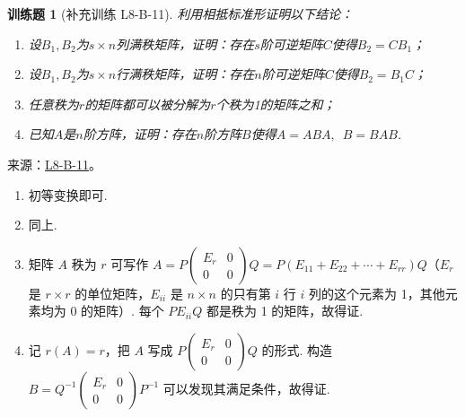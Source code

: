 \documentclass[UTF8,12pt,a4paper,fontset=fandol]{ctexart}
\newtheorem{exercise}{训练题}[section]
\begin{document}
\begin{exercise}[补充训练 L8-B-11]\label{prob:L8-B-11}
利用相抵标准形证明以下结论：
        \begin{enumerate}
            \item 设$B_1,B_2$为$s \times n$列满秩矩阵，证明：存在$s$阶可逆矩阵$C$使得$B_2=CB_1$；

            \item 设$B_1,B_2$为$s \times n$行满秩矩阵，证明：存在$n$阶可逆矩阵$C$使得$B_2=B_1C$；

            \item 任意秩为$r$的矩阵都可以被分解为$r$个秩为1的矩阵之和；

            \item 已知$A$是$n$阶方阵，证明：存在$n$阶方阵$B$使得$A=ABA,\enspace B=BAB$.
        \end{enumerate}
\end{exercise}
\noindent 来源：\href{https://github.com/yhwu-is/Linear-Algebra-Left-Undone/blob/new/%E8%AE%B2%E4%B9%89/%E4%B8%93%E9%A2%98/8%20%E7%9B%B8%E6%8A%B5%E6%A0%87%E5%87%86%E5%BD%A2.tex}{L8-B-11}。
\begin{solve}
\begin{enumerate}
                \item 初等变换即可.

                \item 同上.

                \item 矩阵 $A$ 秩为 $r$ 可写作 $A=P\begin{pmatrix}E_r & 0 \\ 0 & 0\end{pmatrix}Q = P(E_{11}+E_{22}+\cdots+E_{rr})Q$（$E_r$ 是 $r\times r$ 的单位矩阵，$E_{ii}$ 是 $n\times n$ 的只有第 $i$ 行 $i$ 列的这个元素为 1，其他元素均为 0 的矩阵）. 每个 $PE_{ii}Q$ 都是秩为 1 的矩阵，故得证.

                \item 记 $r(A)=r$，把 $A$ 写成 $P\begin{pmatrix}E_r & 0 \\ 0 & 0\end{pmatrix}Q$ 的形式. 构造 $B=Q^{-1}\begin{pmatrix}E_r & 0 \\ 0 & 0\end{pmatrix}P^{-1}$ 可以发现其满足条件，故得证.
            \end{enumerate}
\end{solve}
\end{document}
